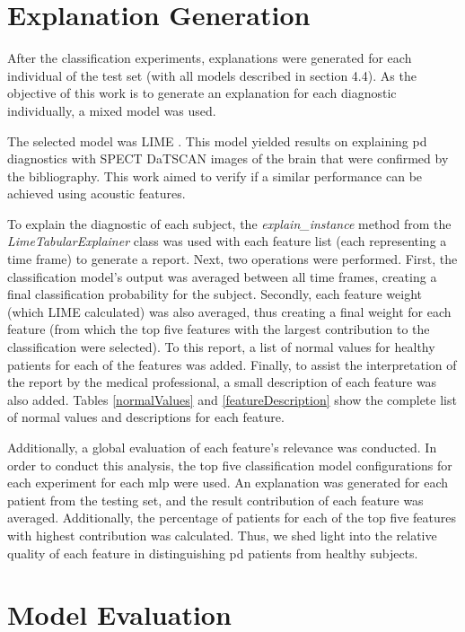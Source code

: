 \section{Explanation Generation}

After the classification experiments, explanations were generated for each individual of the test set (with all models described in section 4.4). As the objective of this work is to generate an explanation for each diagnostic individually, a mixed model was used.

The selected model was LIME \cite{LIME}. This model yielded results on explaining \gls{pd} diagnostics with SPECT DaTSCAN images of the brain that were confirmed by the bibliography. This work aimed to verify if a similar performance can be achieved using acoustic features.

To explain the diagnostic of each subject, the \textit{explain\_instance} method from the \textit{LimeTabularExplainer} class was used with each feature list (each representing a time frame) to generate a report. Next, two operations were performed. First, the classification model's output was averaged between all time frames, creating a final classification probability for the subject. Secondly, each feature weight (which LIME calculated) was also averaged, thus creating a final weight for each feature (from which the top five features with the largest contribution to the classification were selected). To this report, a list of normal values for healthy patients for each of the features was added. Finally, to assist the interpretation of the report by the medical professional, a small description of each feature was also added. Tables \ref{normalValues} and \ref{featureDescription} show the complete list of normal values and descriptions for each feature.

Additionally, a global evaluation of each feature's relevance was conducted. In order to conduct this analysis, the top five classification model configurations for each experiment for each \gls{mlp} were used. An explanation was generated for each patient from the testing set, and the result contribution of each feature was averaged. Additionally, the percentage of patients for each of the top five features with highest contribution was calculated. Thus, we shed light into the relative quality of each feature in distinguishing \gls{pd} patients from healthy subjects.

\section{Model Evaluation}

